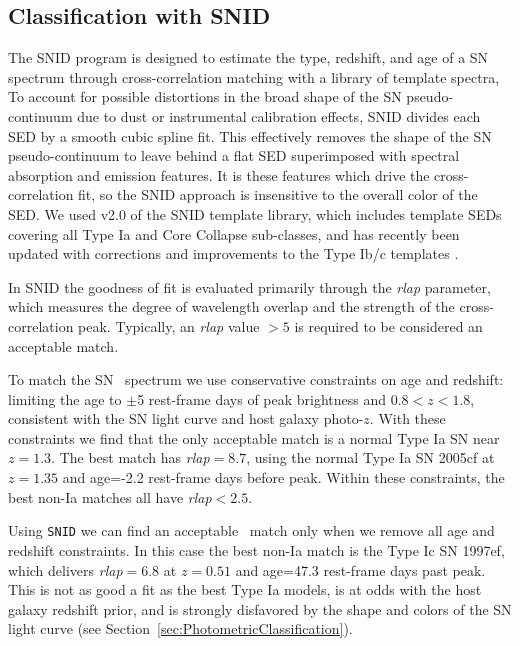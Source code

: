 \subsection{Classification with SNID}
\label{sec:SNID}

The SNID program is designed to estimate the type, redshift, and age
of a SN spectrum through cross-correlation matching with a library of
template spectra, 
To account for possible distortions in the broad shape of the SN
pseudo-continuum due to dust or instrumental calibration effects, SNID
divides each SED by a smooth cubic spline fit. This effectively
removes the shape of the SN pseudo-continuum to leave behind a flat
SED superimposed with spectral absorption and emission features.  It
is these features which drive the cross-correlation fit, so the SNID
approach is insensitive to the overall color of the SED.  We used v2.0
of the SNID template library, which includes template SEDs covering
all Type Ia and Core Collapse sub-classes, and has recently been
updated with corrections and improvements to the Type Ib/c
templates \citep{Liu:2014}.

In SNID the goodness of fit is evaluated primarily through the {\it
rlap} parameter, which measures the degree of wavelength overlap and
the strength of the cross-correlation peak.  Typically, an {\it rlap}
value $>5$ is required to be considered an acceptable match.  

To match the SN \tomas\ spectrum we use conservative constraints on
age and redshift: limiting the age to $\pm$5 rest-frame days of peak
brightness and $0.8<z<1.8$, consistent with the SN light curve and
host galaxy photo-$z$.  With these constraints we find that the only
acceptable match is a normal Type Ia SN near $z=1.3$. The best match
has {\it rlap}$=8.7$, using the normal Type Ia SN 2005cf at $z=1.35$
and age=-2.2 rest-frame days before peak.  Within these constraints,
the best non-Ia matches all have {\it rlap}$<2.5$.

Using {\tt SNID} we can find an acceptable \CCSN\ match only
when we remove all age and redshift constraints. In this case the best
non-Ia match is the Type Ic SN 1997ef, which delivers {\it rlap}$=6.8$
at $z=0.51$ and age=47.3 rest-frame days past peak.  This is not as
good a fit as the best Type Ia models, is at odds with the host galaxy
redshift prior, and is strongly disfavored by the shape and colors of
the SN light curve (see Section~\ref{sec:PhotometricClassification}).  

